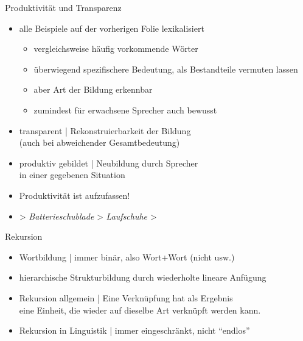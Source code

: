 \begin{frame}
  {Produktivität und Transparenz}
  \onslide<+->
  \begin{itemize}[<+->]
    \item \alert{alle} Beispiele auf der vorherigen Folie \alert{lexikalisiert}
      \begin{itemize}[<+->]
        \item vergleichsweise häufig vorkommende Wörter
        \item überwiegend spezifischere Bedeutung, als Bestandteile vermuten lassen
        \item aber Art der Bildung erkennbar
        \item zumindest für erwachsene Sprecher auch bewusst
      \end{itemize}
      \Halbzeile
    \item \alert{transparent} | Rekonstruierbarkeit der Bildung\\
      (auch bei abweichender Gesamtbedeutung)
      \Halbzeile
    \item \alert{produktiv gebildet} | Neubildung durch Sprecher\\
      in einer gegebenen Situation
    \item Produktivität ist  aufzufassen!
    \item {} > \textit{Batterieschublade} > \textit{Laufschuhe} > 
  \end{itemize}
\end{frame}

\begin{frame}[fragile,label=hierarchie]
  {Rekursion}
  \onslide<+->
  \onslide<+->
  \begin{center}
    \scalebox{0.7}{
      \begin{forest}
        [Bushaltestellenunterstandsreparatur
          [Bushaltestellenunterstand
            [Bushaltestelle
              [Bus]
              [Haltestelle
                [halten]
                [Stelle]
              ]
            ]
            [Unterstand
              [unter]
              [Stand]
            ]
          ]
          [Reparatur]
        ]
      \end{forest}
    }
  \end{center}
  \begin{itemize}[<+->]
    \item Wortbildung | immer \alert{binär}, also \alert{Wort+Wort} (nicht  usw.)
      \Viertelzeile
    \item \alert{hierarchische Strukturbildung} durch wiederholte lineare Anfügung
      \Viertelzeile
    \item Rekursion allgemein | \alert{Eine Verknüpfung hat als Ergebnis\\
      eine Einheit, die wieder auf dieselbe Art verknüpft werden kann.}
    \item Rekursion in Linguistik | immer eingeschränkt, nicht "`endlos"'
  \end{itemize}
\end{frame}

